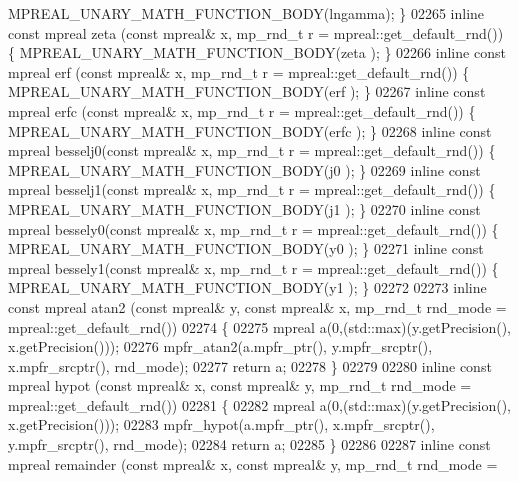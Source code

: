 \begin{DoxyCode}
{{      MPREAL\_UNARY\_MATH\_FUNCTION\_BODY(lngamma);    \}
02265 \textcolor{keyword}{inline} \textcolor{keyword}{const} mpreal zeta    (\textcolor{keyword}{const} mpreal& x, mp\_rnd\_t r = mpreal::get\_default\_rnd()) \{   
      MPREAL\_UNARY\_MATH\_FUNCTION\_BODY(zeta   );    \}
02266 \textcolor{keyword}{inline} \textcolor{keyword}{const} mpreal erf     (\textcolor{keyword}{const} mpreal& x, mp\_rnd\_t r = mpreal::get\_default\_rnd()) \{   
      MPREAL\_UNARY\_MATH\_FUNCTION\_BODY(erf    );    \}
02267 \textcolor{keyword}{inline} \textcolor{keyword}{const} mpreal erfc    (\textcolor{keyword}{const} mpreal& x, mp\_rnd\_t r = mpreal::get\_default\_rnd()) \{   
      MPREAL\_UNARY\_MATH\_FUNCTION\_BODY(erfc   );    \}
02268 \textcolor{keyword}{inline} \textcolor{keyword}{const} mpreal besselj0(\textcolor{keyword}{const} mpreal& x, mp\_rnd\_t r = mpreal::get\_default\_rnd()) \{   
      MPREAL\_UNARY\_MATH\_FUNCTION\_BODY(j0     );    \}
02269 \textcolor{keyword}{inline} \textcolor{keyword}{const} mpreal besselj1(\textcolor{keyword}{const} mpreal& x, mp\_rnd\_t r = mpreal::get\_default\_rnd()) \{   
      MPREAL\_UNARY\_MATH\_FUNCTION\_BODY(j1     );    \}
02270 \textcolor{keyword}{inline} \textcolor{keyword}{const} mpreal bessely0(\textcolor{keyword}{const} mpreal& x, mp\_rnd\_t r = mpreal::get\_default\_rnd()) \{   
      MPREAL\_UNARY\_MATH\_FUNCTION\_BODY(y0     );    \}
02271 \textcolor{keyword}{inline} \textcolor{keyword}{const} mpreal bessely1(\textcolor{keyword}{const} mpreal& x, mp\_rnd\_t r = mpreal::get\_default\_rnd()) \{   
      MPREAL\_UNARY\_MATH\_FUNCTION\_BODY(y1     );    \}
02272 
02273 \textcolor{keyword}{inline} \textcolor{keyword}{const} mpreal atan2 (\textcolor{keyword}{const} mpreal& y, \textcolor{keyword}{const} mpreal& x, mp\_rnd\_t rnd\_mode = mpreal::get\_default\_rnd())
02274 \{
02275     mpreal a(0,(std::max)(y.getPrecision(), x.getPrecision()));
02276     mpfr\_atan2(a.mpfr\_ptr(), y.mpfr\_srcptr(), x.mpfr\_srcptr(), rnd\_mode);
02277     \textcolor{keywordflow}{return} a;
02278 \}
02279 
02280 \textcolor{keyword}{inline} \textcolor{keyword}{const} mpreal hypot (\textcolor{keyword}{const} mpreal& x, \textcolor{keyword}{const} mpreal& y, mp\_rnd\_t rnd\_mode = mpreal::get\_default\_rnd())
02281 \{
02282     mpreal a(0,(std::max)(y.getPrecision(), x.getPrecision()));
02283     mpfr\_hypot(a.mpfr\_ptr(), x.mpfr\_srcptr(), y.mpfr\_srcptr(), rnd\_mode);
02284     \textcolor{keywordflow}{return} a;
02285 \}
02286 
02287 \textcolor{keyword}{inline} \textcolor{keyword}{const} mpreal remainder (\textcolor{keyword}{const} mpreal& x, \textcolor{keyword}{const} mpreal& y, mp\_rnd\_t rnd\_mode = 
}}
\end{DoxyCode}
